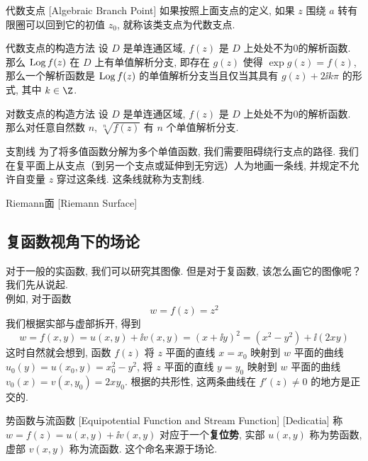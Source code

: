 \documentclass[UTF8]{ctexart}
\begin{document}
        \begin{dfn}
            {代数支点}
            [Algebraic Branch Point]
            如果按照上面支点的定义, 如果 \(z\) 围绕 \(a\) 转有限圈可以回到它的初值 \(z_0\), 就称该类支点为代数支点. 
        \end{dfn}

        \begin{ppt}
            {代数支点的构造方法}
            设 \(D\) 是单连通区域,  \(f(z)\) 是 \(D\) 上处处不为0的解析函数. 那么 \(\operatorname{Log} f(z)\) 在 \(D\) 上有单值解析分支, 即存在 \(g(z)\) 使得 \(\exp g(z)=f(z)\), 那么一个解析函数是 \(\operatorname{Log} f(z)\) 的单值解析分支当且仅当其具有 \(g(z)+2\ii k\pi\) 的形式, 其中 \(k\in\Z\).
        \end{ppt}

        \begin{ppt}
            {对数支点的构造方法}
            设 \(D\) 是单连通区域,  \(f(z)\) 是 \(D\) 上处处不为0的解析函数. 那么对任意自然数 \(n\),  \(\sqrt[n]{f(z)}\) 有 \(n\) 个单值解析分支. 
        \end{ppt}

        \begin{dfn}
            {支割线}
            为了将多值函数分解为多个单值函数, 我们需要阻碍绕行支点的路径. 我们在复平面上从支点（到另一个支点或延伸到无穷远）人为地画一条线, 并规定不允许自变量 \(z\) 穿过这条线. 这条线就称为支割线. 
        \end{dfn}

        \begin{dfn}
            {Riemann面}
            [Riemann Surface]
        \end{dfn}
    
    \subsection{复函数视角下的场论}

        对于一般的实函数, 我们可以研究其图像. 但是对于复函数, 该怎么画它的图像呢？我们先从 说起. \\
        例如, 对于函数
        \[w=f(z)=z^2\]
        我们根据实部与虚部拆开, 得到
        \[w=f(x,y)=u(x,y)+\ii v(x,y)=(x+\ii y)^2=(x^2-y^2)+\ii(2xy)\]
        这时自然就会想到, 函数 \(f(z)\) 将 \(z\) 平面的直线 \(x=x_0\) 映射到 \(w\) 平面的曲线 \(u_0(y)=u(x_0,y)=x_0^2-y^2\), 将 \(z\) 平面的直线 \(y=y_0\) 映射到 \(w\) 平面的曲线 \(v_0(x)=v(x,y_0)=2xy_0\). 根据 的共形性, 这两条曲线在 \(f'(z)\neq 0\) 的地方是正交的. 

        \begin{dfn}
            [UUID]
            {势函数与流函数}
            [Equipotential Function and Stream Function]
            [Dedicatia]
            称  \(w=f(z)=u(x,y)+\ii v(x,y)\) 对应于一个\textbf{复位势}, 实部 \(u(x,y)\) 称为势函数, 虚部 \(v(x,y)\) 称为流函数. 这个命名来源于场论. 
        \end{dfn}
\end{document}

